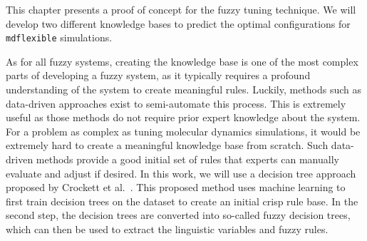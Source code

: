 \newcommand{\crispTreeNode}[2]{
    \begin{tikzpicture}
        \begin{axis}%
            [
                title = {Crisp Split: $#1 \leq #2$},
                width=4.5cm,
                height=3cm,
                axis lines=center,
                xlabel={#1},
                x label style={at={(axis description cs:0.9,-0.1)},anchor=north},
                ylabel=$\mu$,
                y label style={at={(axis description cs:0.5,1)},anchor=south},
                xmin=-5,
                xmax=5,
                xtick={},
                xticklabels= {},
                ytick={},
                yticklabels={},
                extra x ticks={0},
                extra x tick labels={#2},
                ymin=-0.1,
                ymax=1.1,
                samples=50,
                extra y ticks={1},
                every axis plot/.append style={thick}
            ]
            \addplot[red,domain=-5:-0.6] {step(x,0,-1)};
            \addplot[blue,domain=0.6:5] {step(x,0,1)};
            \addplot[red,domain=0.6:5] {step(x,0,-1)};
            \addplot[blue,domain=-5:-0.6] {step(x,0,1)};

            \node[draw,draw=black,circle,inner sep=1pt,minimum width=3pt,thick] at (axis cs:0,1) {};
            \node[draw,draw=black,circle,inner sep=1pt,minimum width=3pt,thick] at (axis cs:0,0) {};

            \node[anchor=center, red] at (axis cs:-2.9,0.6) {$#1 \leq #2$};
            \node[anchor=center, blue] at (axis cs:3.1,0.6) {$#1 > #2$};
        \end{axis}

    \end{tikzpicture}
}



This chapter presents a proof of concept for the fuzzy tuning technique. We will develop two different knowledge bases to predict the optimal configurations for \texttt{\gls{mdflexible}} simulations.

As for all fuzzy systems, creating the knowledge base is one of the most complex parts of developing a fuzzy system, as it typically requires a profound understanding of the system to create meaningful rules. Luckily, methods such as data-driven approaches exist to semi-automate this process. This is extremely useful as those methods do not require prior expert knowledge about the system. For a problem as complex as tuning molecular dynamics simulations, it would be extremely hard to create a meaningful knowledge base from scratch. Such data-driven methods provide a good initial set of rules that experts can manually evaluate and adjust if desired. In this work, we will use a decision tree approach proposed by Crockett et al.~\cite{CROCKETT20062809}. This proposed method uses machine learning to first train decision trees on the dataset to create an initial crisp rule base. In the second step, the decision trees are converted into so-called fuzzy decision trees, which can then be used to extract the linguistic variables and fuzzy rules.


